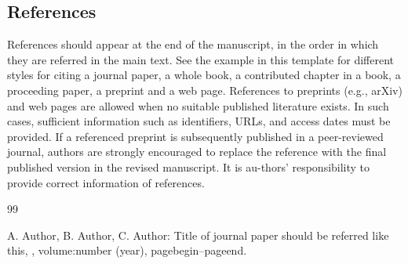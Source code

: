 \documentclass[journal]{jasse-modern}
\begin{document}
\subsection{References}
References should appear at the end of the manuscript, in the order in which they are referred in the main text.
See the example in this template for different styles for citing a journal paper, a whole book, a contributed chapter in a book, a proceeding paper, a preprint and a web page.
References to preprints (e.g., arXiv) and web pages are allowed when no suitable published literature exists.
In such cases, sufficient information such as identifiers, URLs, and access dates must be provided.
If a referenced preprint is subsequently published in a peer-reviewed journal, authors are strongly encouraged to replace the reference with the final published version in the revised manuscript.
It is au-thors' responsibility to provide correct information of references.

\begin{thebibliography}{99}

A. Author, B. Author, C. Author:
\newblock Title of journal paper should be referred like this,
,
volume:number (year), pagebegin--pageend.

\end{thebibliography}
\end{document}
